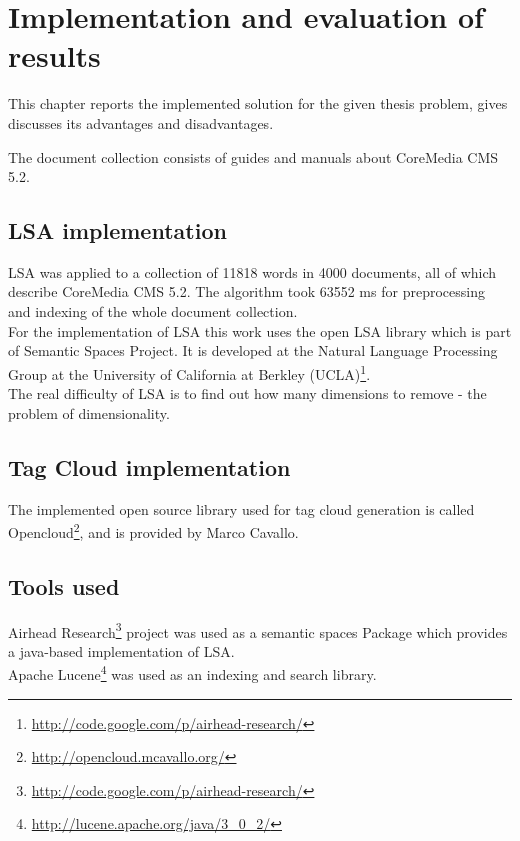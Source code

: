 \chapter{Implementation and evaluation of results}
\label{sec:implementation}

\begin{summary}
This chapter reports the implemented solution for the given thesis problem, gives discusses its advantages and disadvantages.
\end{summary}


The document collection consists of guides and manuals about CoreMedia \gls{CMS} 5.2.\\

\section{LSA implementation}
\label{sec:implementation:lsa_impl}
\gls{LSA} was applied to a collection of 11818 words in 4000 documents, all of which describe CoreMedia \gls{CMS} 5.2. The algorithm took  63552 ms for preprocessing and indexing of the whole document collection. \\

For the implementation of LSA this work uses the open LSA library which is part of Semantic Spaces Project\cite{S-Space}. It is developed at the Natural Language Processing Group at the University of California at Berkley (UCLA)\footnote{\url{http://code.google.com/p/airhead-research/}}.\\

The real difficulty of LSA is to find out how many dimensions to remove - the problem of dimensionality.\\

\section{Tag Cloud implementation}
\label{sec:implementation:tag_cloud}
The implemented open source library used for tag cloud generation is called Opencloud\footnote{\url{http://opencloud.mcavallo.org/}}, and is provided by Marco Cavallo.\\

\section{Tools used}
\label{sec:implementation:tools_used}
Airhead Research\footnote{\url{http://code.google.com/p/airhead-research/}} project was used as a semantic spaces Package which provides a java-based implementation of \gls{LSA}.\\

Apache Lucene\footnote{\url{http://lucene.apache.org/java/3_0_2/}} was used as an indexing and search library.
